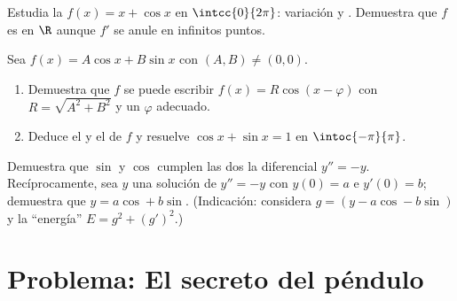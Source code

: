 \begin{exercise}[$\star\star$]\label{exo:g12:trigo:7}
Estudia la  $f(x) = x + \cos x$ en $\intcc{0}{2\pi}$: variación y
. Demuestra que $f$ es  en $\R$ aunque $f'$ se anule en
infinitos puntos.
\end{exercise}

\begin{exercise}[$\star\star\star$]\label{exo:g12:trigo:8}
Sea $f(x) = A\cos x + B \sin x$ con $(A,B) \neq (0,0)$.
\begin{enumerate}
  \item Demuestra que $f$ se puede escribir $f(x) = R\cos(x - \varphi)$ con
        $R = \sqrt{A^2 + B^2}$ y un $\varphi$ adecuado.
  \item Deduce el  y el  de $f$ y resuelve
        $\cos x + \sin x = 1$ en $\intoc{-\pi}{\pi}$.
\end{enumerate}
\end{exercise}

\begin{exercise}[$\star\star\star$]\label{exo:g12:trigo:9}
Demuestra que $\sin$ y $\cos$ cumplen las dos la  diferencial
$y'' = -y$. Recíprocamente, sea $y$ una solución de $y'' = -y$ con
$y(0) = a$ e $y'(0) = b$; demuestra que $y = a\cos + b\sin$. (Indicación:
considera $g = (y - a\cos - b\sin)$ y la ``energía''
$E = g^2 + (g')^2$.)
\end{exercise}

\section{Problema: El secreto del péndulo}

